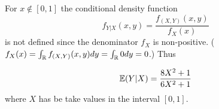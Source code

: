 
For $ x \notin [0,1] $  the conditional density function 
\[
    f_{Y|X} (x,y) = \frac{f_{(X,Y)} (x,y)}{f_{X} (x)}  
\] 
is not defined since the denominator $ f_{X} $ is non-positive. ($ f_{X} (x) = \int_{\mathbb{R}} f_{(X,Y)}
(x,y) dy = \int_{\mathbb{R}} 0 dy = 0$.) Thus 

\[
    \mathbb{E}(Y |X) = \frac{8 X^2 + 1}{6 X^2 +1} 
\] 
where $ X$ has be take values in the interval $ [0,1]$. 
